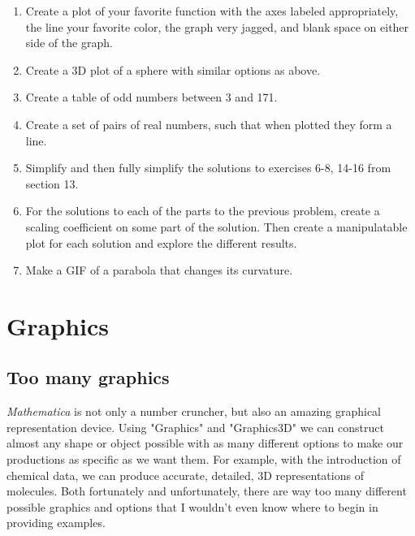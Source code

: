 \documentclass[11pt,letterpaper,twoside,titlepage]{report}
\newcommand{\Mathematica}{\textit{Mathematica} }
\begin{document}
			\begin{enumerate}
			
				\item %
				
					Create a plot of your favorite function with the axes labeled appropriately, the line your favorite color, the graph very jagged, and blank space on either side of the graph.
					
				\item %
				
					Create a 3D plot of a sphere with similar options as above.
					
				\item %
				
					Create a table of odd numbers between 3 and 171.
					
				\item %
				
					Create a set of pairs of real numbers, such that when plotted they form a line.
					
				\item %
				
					Simplify and then fully simplify the solutions to exercises 6-8, 14-16 from section 13.
					
				\item %
				
					For the solutions to each of the parts to the previous problem, create a scaling coefficient on some part of the solution.  Then create a manipulatable plot for each solution and explore the different results.
					
				\item %
				
					Make a GIF of a parabola that changes its curvature.
			
			\end{enumerate}
			
	\part{Graphics}
	
		\chapter{Too many graphics}
		
			\Mathematica is not only a number cruncher, but also an amazing graphical representation device.  Using "Graphics" and "Graphics3D" we can construct almost any shape or object possible with as many different options to make our productions as specific as we want them.  For example, with the introduction of chemical data, we can produce accurate, detailed, 3D representations of molecules.  Both fortunately and unfortunately, there are way too many different possible graphics and options that I wouldn't even know where to begin in providing examples. \\
		
\end{document}
